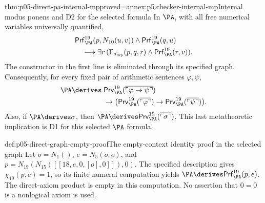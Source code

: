 \begin{hbtheorem}{thm:p05-direct-pa-internal-mp}{proved=annex:p5.checker-internal-mp}{Internal modus ponens and D2 for the selected formula}
In \(\PA\), with all free numerical variables universally quantified,
\[
\begin{split}
 &\mathsf{Prf}^{19}_{\PA}(p,N_{10}(u,v))
       \land\mathsf{Prf}^{19}_{\PA}(q,u)\\
 &\quad\longrightarrow\exists r\,
       (\Gamma_{d_{\rm mp}}(p,q,r)
                         \land\mathsf{Prf}^{19}_{\PA}(r,v)).
\end{split}
\]
The constructor in the first line is eliminated through its specified graph.
Consequently, for every fixed pair of arithmetic sentences \(\varphi,\psi\),
\[
\begin{split}
 \PA\derives\;&\mathsf{Prv}^{19}_{\PA}
                   (\overline{\ulcorner\varphi\to\psi\urcorner})\\
 &\to\bigl(\mathsf{Prv}^{19}_{\PA}
                    (\overline{\ulcorner\varphi\urcorner})
       \to\mathsf{Prv}^{19}_{\PA}
                    (\overline{\ulcorner\psi\urcorner})\bigr).
\end{split}
\]
Also, if \(\PA\derives\sigma\), then
\(\PA\derives\mathsf{Prv}^{19}_{\PA}
                     (\overline{\ulcorner\sigma\urcorner})\).
This last metatheoretic implication is D1 for this selected \(\PA\) formula.
\end{hbtheorem}

\begin{hbexample}{def:p05-direct-graph-empty-proof}{The empty-context identity proof in the selected graph}
Let \(o=N_1()\), \(e=N_5(o,o)\), and
\(p=N_{19}(N_{15}([[18,e,0,[o],0]]),0)\).
The specified description gives \(\chi_{19}(p,e)=1\), so its finite
numeral computation yields
\(\PA\derives\mathsf{Prf}^{19}_{\PA}(\bar p,\bar e)\).
The direct-axiom product is empty in this computation.  No assertion that
\(0=0\) is a nonlogical axiom is used.
\end{hbexample}


